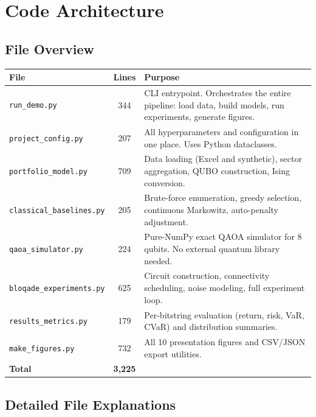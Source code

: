 \documentclass[12pt, a4paper]{article}
\begin{document}
\section{Code Architecture}

\subsection{File Overview}

\begin{center}
\begin{longtable}{lcp{7cm}}
\toprule
\textbf{File} & \textbf{Lines} & \textbf{Purpose} \\
\midrule
\endhead
\texttt{run\_demo.py} & 344 & CLI entrypoint. Orchestrates the entire pipeline: load data, build models, run experiments, generate figures. \\
\texttt{project\_config.py} & 207 & All hyperparameters and configuration in one place. Uses Python dataclasses. \\
\texttt{portfolio\_model.py} & 709 & Data loading (Excel and synthetic), sector aggregation, QUBO construction, Ising conversion. \\
\texttt{classical\_baselines.py} & 205 & Brute-force enumeration, greedy selection, continuous Markowitz, auto-penalty adjustment. \\
\texttt{qaoa\_simulator.py} & 224 & Pure-NumPy exact QAOA simulator for 8 qubits. No external quantum library needed. \\
\texttt{bloqade\_experiments.py} & 625 & Circuit construction, connectivity scheduling, noise modeling, full experiment loop. \\
\texttt{results\_metrics.py} & 179 & Per-bitstring evaluation (return, risk, VaR, CVaR) and distribution summaries. \\
\texttt{make\_figures.py} & 732 & All 10 presentation figures and CSV/JSON export utilities. \\
\midrule
\textbf{Total} & \textbf{3{,}225} & \\
\bottomrule
\end{longtable}
\end{center}

\subsection{Detailed File Explanations}
\end{document}
